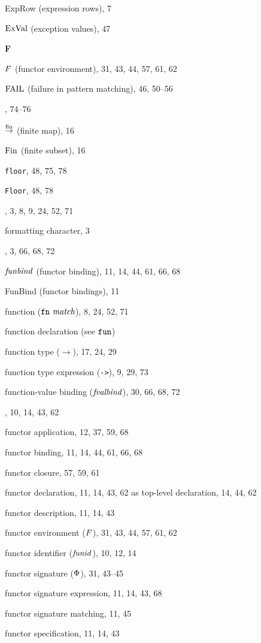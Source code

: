 \begin{theindex}
\item ExpRow (expression rows), 7
\item ${\rm ExVal}$ (exception values), 47
\indexspace
\parbox{65mm}{\hfil{\large\bf F}\hfil}
\indexspace
\item $F$ (functor environment), 31, 43, 44, 57, 61, 62
\item ${\rm FAIL}$ (failure in pattern matching), 46, 50--56
\item \FALSE, 74--76
\item $\stackrel{{\rm fin}}{\to}$ (finite map), 16
\item $\mathop{\rm Fin}\nolimits$ (finite subset), 16
\item {\tt floor}, 48, 75, 78
\item {\tt Floor}, 48, 78
\item \FN, 3, 8, 9, 24, 52, 71
\item formatting character, 3
\item \FUN, 3, 66, 68, 72
\item ${\it funbind}$ (functor binding), 11, 14, 44, 61, 66, 68
\item FunBind (functor bindings), 11
\item function ($\mbox{{\tt fn}\ {\it match}}$), 8, 24, 52, 71
\item function declaration (see ${\tt fun}$) 
\item function type ($\rightarrow$), 17, 24, 29
\item function type expression (\verb+->+), 9, 29, 73
\item function-value binding (${\it fvalbind}$), 30, 66, 68, 72
\item \FUNCTOR, 10, 14, 43, 62
\item functor application, 12, 37, 59, 68
\item functor binding, 11, 14, 44, 61, 66, 68
\item functor closure, 57, 59, 61
\item functor declaration, 11, 14, 43, 62
\subitem as top-level declaration, 14, 44, 62
\item functor description, 11, 14, 43
\item functor environment ($F$), 31, 43, 44, 57, 61, 62
\item functor identifier (${\it funid}$), 10, 12, 14
\item functor signature ($\Phi$), 31, 43--45
\item functor signature expression, 11, 14, 43, 68
\item functor signature matching, 11, 45
\item functor specification, 11, 14, 43

\end{theindex}
